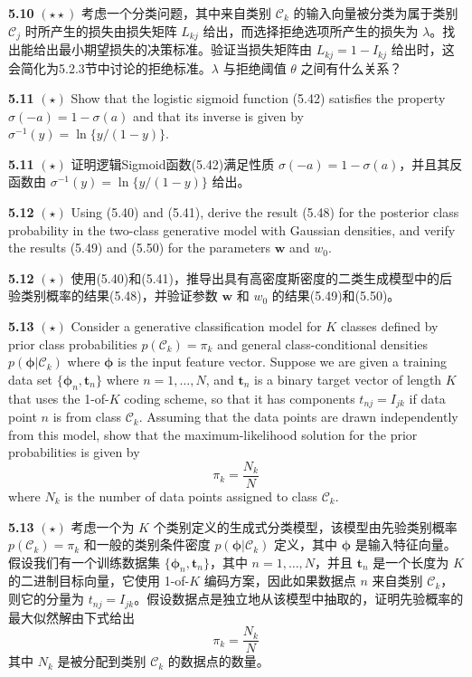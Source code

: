 \documentclass{article}
\begin{document}
\textbf{5.10} $(\star\star)$ 考虑一个分类问题，其中来自类别 $\mathcal{C}_k$ 的输入向量被分类为属于类别 $\mathcal{C}_j$ 时所产生的损失由损失矩阵 $L_{kj}$ 给出，而选择拒绝选项所产生的损失为 $\lambda$。找出能给出最小期望损失的决策标准。验证当损失矩阵由 $L_{kj} = 1 - I_{kj}$ 给出时，这会简化为5.2.3节中讨论的拒绝标准。$\lambda$ 与拒绝阈值 $\theta$ 之间有什么关系？


\textbf{5.11} $(\star)$ Show that the logistic sigmoid function (5.42) satisfies the property $\sigma(-a) = 1 - \sigma(a)$ and that its inverse is given by $\sigma^{-1}(y) = \ln \{y/(1-y)\}$.

\textbf{5.11} $(\star)$ 证明逻辑Sigmoid函数(5.42)满足性质 $\sigma(-a) = 1 - \sigma(a)$，并且其反函数由 $\sigma^{-1}(y) = \ln \{y/(1-y)\}$ 给出。


\textbf{5.12} $(\star)$ Using (5.40) and (5.41), derive the result (5.48) for the posterior class probability in the two-class generative model with Gaussian densities, and verify the results (5.49) and (5.50) for the parameters $\mathbf{w}$ and $w_0$.

\textbf{5.12} $(\star)$ 使用(5.40)和(5.41)，推导出具有高密度斯密度的二类生成模型中的后验类别概率的结果(5.48)，并验证参数 $\mathbf{w}$ 和 $w_0$ 的结果(5.49)和(5.50)。


\textbf{5.13} $(\star)$ Consider a generative classification model for $K$ classes defined by prior class probabilities $p(\mathcal{C}_k) = \pi_k$ and general class-conditional densities $p(\boldsymbol{\phi}|\mathcal{C}_k)$ where $\boldsymbol{\phi}$ is the input feature vector. Suppose we are given a training data set $\{\boldsymbol{\phi}_n, \mathbf{t}_n\}$ where $n = 1, \dots, N$, and $\mathbf{t}_n$ is a binary target vector of length $K$ that uses the 1-of-$K$ coding scheme, so that it has components $t_{nj} = I_{jk}$ if data point $n$ is from class $\mathcal{C}_k$. Assuming that the data points are drawn independently from this model, show that the maximum-likelihood solution for the prior probabilities is given by
\begin{equation}
\pi_k = \frac{N_k}{N} \tag{5.101}
\end{equation}
where $N_k$ is the number of data points assigned to class $\mathcal{C}_k$.

\textbf{5.13} $(\star)$ 考虑一个为 $K$ 个类别定义的生成式分类模型，该模型由先验类别概率 $p(\mathcal{C}_k) = \pi_k$ 和一般的类别条件密度 $p(\boldsymbol{\phi}|\mathcal{C}_k)$ 定义，其中 $\boldsymbol{\phi}$ 是输入特征向量。假设我们有一个训练数据集 $\{\boldsymbol{\phi}_n, \mathbf{t}_n\}$，其中 $n = 1, \dots, N$，并且 $\mathbf{t}_n$ 是一个长度为 $K$ 的二进制目标向量，它使用 1-of-$K$ 编码方案，因此如果数据点 $n$ 来自类别 $\mathcal{C}_k$，则它的分量为 $t_{nj} = I_{jk}$。假设数据点是独立地从该模型中抽取的，证明先验概率的最大似然解由下式给出
\begin{equation}
\pi_k = \frac{N_k}{N} \tag{5.101}
\end{equation}
其中 $N_k$ 是被分配到类别 $\mathcal{C}_k$ 的数据点的数量。
\end{document}
